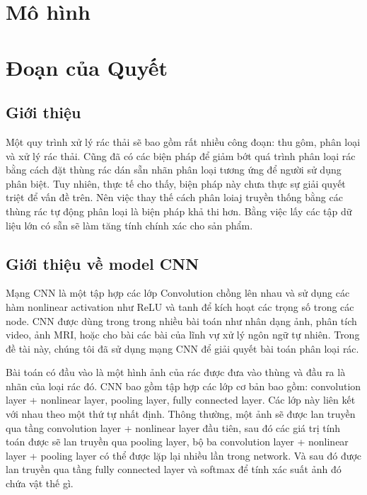 

 







\chapter{ Mô hình}

\chapter{Đoạn của Quyết}
\section{Giới thiệu}
Một quy trình xử lý rác thải sẽ bao gồm rất nhiều công đoạn: thu gôm, phân loại và xử lý rác thải.
Cũng đã có các biện pháp để giảm bớt quá trình phân loại rác bằng cách đặt thùng rác dán sẵn nhãn phân loại tương ứng để người sử dụng phân biệt.
Tuy nhiên, thực tế cho thấy, biện pháp này chưa thực sự giải quyết triệt để vấn đề trên. 
Nên việc thay thế cách phân loiaj truyền thống bằng các thùng rác tự động phân loại là biện pháp khả thi hơn.
Bằng việc lấy các tập dữ liệu lớn có sẵn sẽ làm tăng tính chính xác cho sản phẩm. 

\section{Giới thiệu về model CNN}
Mạng CNN là một tập hợp các lớp Convolution chồng lên nhau và sử dụng các hàm nonlinear activation như ReLU và tanh để kích hoạt các trọng số trong các node. 
CNN được dùng trong trong nhiều bài toán như nhân dạng ảnh, phân tích video, ảnh MRI, hoặc cho bài các bài của lĩnh vự xử lý ngôn ngữ tự nhiên. Trong đề tài này, chúng tôi đã sử dụng mạng CNN để giải quyết bài toán phân loại rác.

Bài toán có đầu vào là một hình ảnh của rác được đưa vào thùng và đầu ra là nhãn của loại rác đó.
CNN bao gồm tập hợp các lớp cơ bản bao gồm: convolution layer + nonlinear layer, pooling layer, fully connected layer. 
Các lớp này liên kết với nhau theo một thứ tự nhất định. Thông thường, một ảnh sẽ được lan truyền qua tầng convolution layer + nonlinear layer đầu tiên, sau đó các giá trị tính toán được sẽ lan truyền qua pooling layer, bộ ba convolution layer + nonlinear layer + pooling layer có thể được lặp lại nhiều lần trong network. Và sau đó được lan truyền qua tầng fully connected layer và softmax để tính xác suất ảnh đó chứa vật thế gì.

